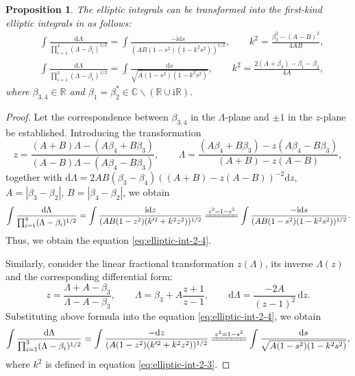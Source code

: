 \documentclass[11pt,reqno]{amsart}
\newcommand{\ii}{\mathrm{i}}
\newcommand{\dd}{\mathrm{d}}
\newtheorem{prop}{Proposition}
\numberwithin{equation}{section}
\begin{document}
\begin{prop}\label{prop:elliptic-int-2}
	The elliptic integrals can be transformed into the first-kind elliptic integrals in  as follows:
	\begin{subequations}\label{eq:elliptic-int-2}
		\begin{align}
			&\int \frac{\dd \Lambda }{\prod_{i=1}^{4}(\Lambda-\beta_i)^{1/2}}
			=\int \frac{- \ii \dd s }{(AB(1-s^2)(1-k^2s^2))^{1/2}},  \qquad 	k^2=\frac{\beta_2^2-(A-B)^2}{4AB}, \label{eq:elliptic-int-2-4}\\
			& \int\frac{\dd \Lambda }{\prod_{i=1}^{3}(\Lambda-\beta_i)^{1/2}} =\int \frac{  \dd s }{\sqrt{A(1-s^2)(1-k^2s^2)}}, \qquad
			k^2=\frac{2(A+\beta_3)-\beta_1-\beta_2}{4A}, \label{eq:elliptic-int-2-3}
		\end{align}	
	\end{subequations}
	where $\beta_{3,4}\in \mathbb{R}$ and $\beta_1=\beta_2^*\in \mathbb{C}\backslash(\mathbb{R}\cup \ii \mathbb{R})$.
\end{prop}
\begin{proof}
	Let the correspondence between $\beta_{3,4}$ in the
 $\Lambda$-plane and $\pm 1$ in the $z$-plane  be established.
 Introducing the transformation
	\begin{equation}\label{eq:trans-L-z-2-1}
		z=\frac{(A+B)\Lambda-(A\beta_4+B\beta_3)}{(A-B)\Lambda-(A\beta_4-B\beta_3)}, \qquad \Lambda=\frac{(A\beta_4+B\beta_3)-z(A\beta_4-B\beta_3)}{(A+B)-z(A-B)}, 
	\end{equation}
	together with $\dd \Lambda=2AB(\beta_3-\beta_4)((A+B)-z(A-B))^{-2} \dd z$,
 $A=|\beta_3-\beta_2|$, $B=|\beta_4-\beta_2|$,
	we obtain 
	\begin{equation}\label{eq:int-1-trans}\nonumber
		\int \frac{  \dd \Lambda}{\prod_{i=1}^{4}(\Lambda-\beta_i)^{1/2}}
		=\int \frac{ \ii  \dd z }{(AB(1-z^2)(k^{\prime2}+k^2z^2))^{1/2}}\xlongequal{z^2=1-s^2}\int \frac{- \ii \dd s }{(AB(1-s^2)(1-k^2s^2))^{1/2}}.
	\end{equation}
	Thus, we obtain the equation \eqref{eq:elliptic-int-2-4}.
	
	Similarly, consider the linear fractional transformation $z(\Lambda)$, its inverse $\Lambda(z)$ and the corresponding differential form:
	\begin{equation}\label{eq:trans-z-Lambda-3}
		z=\frac{\Lambda+A-\beta_3}{\Lambda-A-\beta_3},\qquad \Lambda=\beta_3+A\frac{z+1}{z-1}, \qquad 
		\dd \Lambda=\frac{-2A}{(z-1)^2}\, \dd z.
	\end{equation} 
	Substituting above formula into the equation \eqref{eq:elliptic-int-2-4}, we obtain 
	\begin{equation}
		\int \frac{  \dd \Lambda}{\prod_{i=1}^{3}(\Lambda-\beta_i)^{1/2}}
		= \int \frac{ - \dd z }{(A(1-z^2)(k^{\prime2}+k^2z^2))^{1/2}}\xlongequal{z^2=1-s^2}\int \frac{  \dd s }{\sqrt{A(1-s^2)(1-k^2s^2)}},
	\end{equation}
	where $k^2$ is defined in equation \eqref{eq:elliptic-int-2-3}. 
\end{proof}
\end{document}
